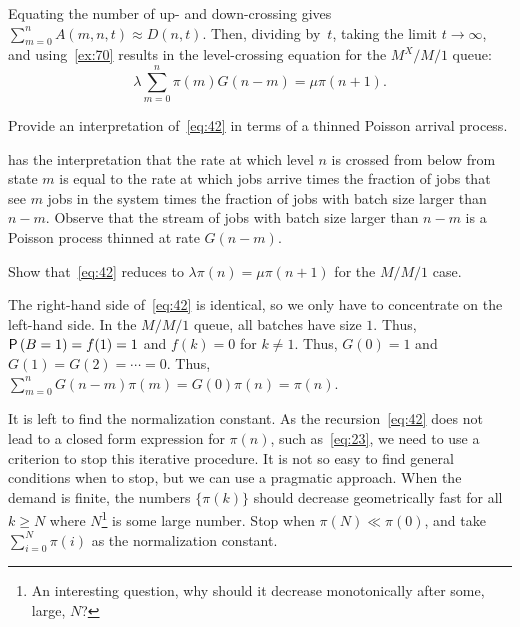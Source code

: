 \documentclass[companion]{subfiles}
\begin{document}
Equating the number of up- and down-crossing gives $\sum_{m=0}^n A(m,n,t) \approx D(n,t)$. 
Then, dividing by~$t$, taking the limit $t\to\infty$, and using~\cref{ex:70} results in the level-crossing equation for the $M^X/M/1$ queue:
\begin{equation}\label{eq:42}
\lambda \sum_{m=0}^n \pi(m) G(n-m) = \mu \pi(n+1).
\end{equation}

\begin{exercise}
Provide an interpretation of~\cref{eq:42} in terms of a thinned Poisson arrival process.
\begin{solution}
  has the interpretation that the rate at which level $n$ is crossed from below from state $m$ is equal to the rate at which jobs arrive times the fraction of jobs that see $m$ jobs in the system times the fraction of jobs with batch size larger than $n-m$.
 Observe that the stream of jobs with batch size larger than $n-m$ is a Poisson process thinned at rate $G(n-m)$.
\end{solution}
\end{exercise}


\begin{extra}
 Show that~\cref{eq:42} reduces to $\lambda \pi(n) = \mu \pi(n+1)$ for the $M/M/1$ case.
\begin{solution}
 The right-hand side of~\cref{eq:42} is identical, so we only have to concentrate on the left-hand side.
 In the $M/M/1$ queue, all batches have size $1$.
 Thus, $\P{B=1} = f(1)=1$ and $f(k)=0$ for $k\neq 1$.
 Thus, $G(0)=1$ and $G(1)=G(2)=\cdots = 0$.
 Thus, $\sum_{m=0}^n G(n-m) \pi(m) = G(0)\pi(n)=\pi(n)$.
\end{solution}
\end{extra}



It is left to find the normalization constant.
As the recursion~\cref{eq:42} does not lead to a closed form expression for $\pi(n)$, such as~\cref{eq:23}, we need to use a criterion to stop this iterative procedure.
It is not so easy to find general conditions when to stop, but we can use a pragmatic approach.
When the demand is finite, the numbers $\{\pi(k)\}$ should decrease geometrically fast for all $k\geq N$ where $N$\footnote{An interesting question, why should it decrease monotonically after some, large, $N$?}
is some large number.
Stop when $\pi(N)\ll \pi(0)$, and take $\sum_{i=0}^N \pi(i)$ as the normalization constant.

\end{document}

